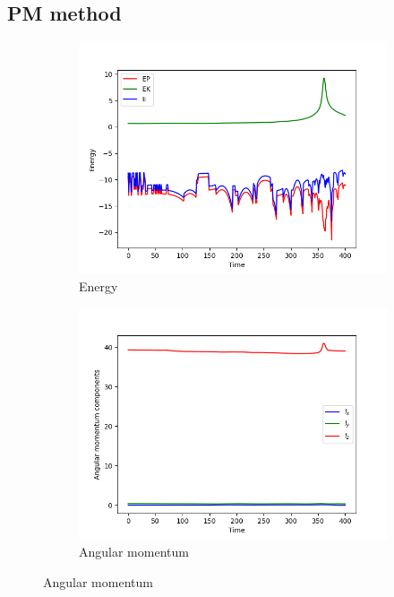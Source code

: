 \subsection{PM method}
\begin{figure}[htp]
    \centering
    \begin{subfigure}[b]{0.45\textwidth}
        \centering
        \includegraphics[width=\textwidth]{chapters/results/img/pm-collision/energy.png}
        \caption{Energy}
        \label{fig:physical-quantities-pm-collision-sub1}
    \end{subfigure}
    \hfill
    \begin{subfigure}[b]{0.45\textwidth}
        \centering
        \includegraphics[width=\textwidth]{chapters/results/img/pm-collision/angular-momentum.png}
        \caption{Angular momentum}
        \label{fig:physical-quantities-pm-collision-sub2}
    \end{subfigure}


\end{figure}
